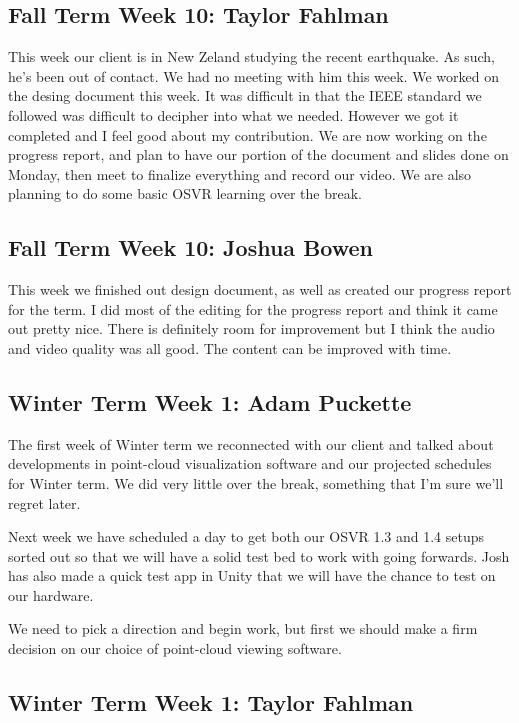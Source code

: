 \documentclass[draftclsnofoot,onecolumn]{IEEEtran}
\begin{document}
\subsection{Fall Term Week 10: Taylor Fahlman}

This week our client is in New Zeland studying the recent earthquake. As such, he's been out of contact. We had no meeting with him this week. We worked on the desing document this week. It was difficult in that the IEEE standard we followed was difficult to decipher into what we needed. However we got it completed and I feel good about my contribution. We are now working on the progress report, and plan to have our portion of the document and slides done on Monday, then meet to finalize everything and record our video. We are also planning to do some basic OSVR learning over the break.

\subsection{Fall Term Week 10: Joshua Bowen}

This week we finished out design document, as well as created our progress report for the term. I did most of the editing for the progress report and think it came out pretty nice. There is definitely room for improvement but I think the audio and video quality was all good. The content can be improved with time.

\subsection{Winter Term Week 1: Adam Puckette}

The first week of Winter term we reconnected with our client and talked about developments in point-cloud visualization software and our projected schedules for Winter term. We did very little over the break, something that I'm sure we'll regret later.

Next week we have scheduled a day to get both our OSVR 1.3 and 1.4 setups sorted out so that we will have a solid test bed to work with going forwards. Josh has also made a quick test app in Unity that we will have the chance to test on our hardware.

We need to pick a direction and begin work, but first we should make a firm decision on our choice of point-cloud viewing software.

\subsection{Winter Term Week 1: Taylor Fahlman}
\end{document}
